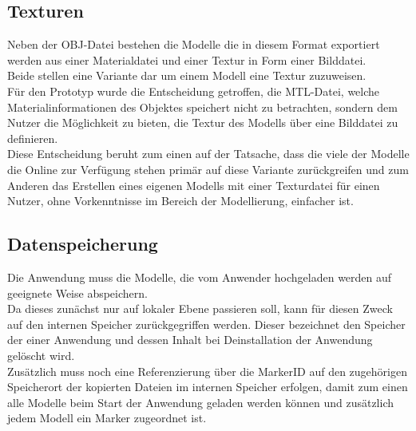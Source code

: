 \subsection{Texturen}
Neben der OBJ-Datei bestehen die Modelle die in diesem Format exportiert werden aus einer Materialdatei und einer Textur in Form einer Bilddatei.\\
Beide stellen eine Variante dar um einem Modell eine Textur zuzuweisen.\\
Für den Prototyp wurde die Entscheidung getroffen, die MTL-Datei, welche Materialinformationen des Objektes speichert nicht zu betrachten, sondern dem Nutzer die Möglichkeit zu bieten, die Textur des Modells über eine Bilddatei zu definieren.\\
Diese Entscheidung beruht zum einen auf der Tatsache, dass die viele der Modelle die Online zur Verfügung stehen primär auf diese Variante zurückgreifen und zum Anderen das Erstellen eines eigenen Modells mit einer Texturdatei für einen Nutzer, ohne Vorkenntnisse im Bereich der Modellierung, einfacher ist.


\subsection{Datenspeicherung}
Die Anwendung muss die Modelle, die vom Anwender hochgeladen werden auf geeignete Weise abspeichern.\\
Da dieses zunächst nur auf lokaler Ebene passieren soll, kann für diesen Zweck auf den internen Speicher zurückgegriffen werden. Dieser bezeichnet den Speicher der einer Anwendung und dessen Inhalt bei Deinstallation der Anwendung gelöscht wird. \\
Zusätzlich muss noch eine Referenzierung über die MarkerID auf den zugehörigen Speicherort der kopierten Dateien im internen Speicher erfolgen, damit zum einen alle Modelle beim Start der Anwendung geladen werden können und zusätzlich jedem Modell ein Marker zugeordnet ist.
 
